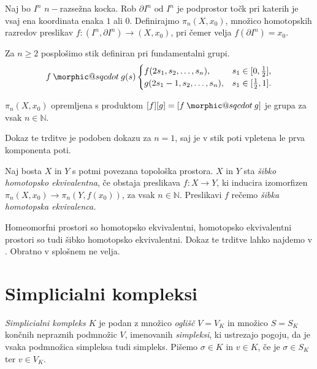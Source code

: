\documentclass[mat1]{fmfdelo}
\makeatletter
\DeclareRobustCommand{\sqcdot}{\mathbin{\mathpalette\morphic@sqcdot\relax}}
\newcommand{\morphic@sqcdot}[2]{%
\sbox\z@{$\m@th#1\centerdot$}%
\ht\z@=.33333\ht\z@
\vcenter{\box\z@}%
}
\newcommand{\N}{\mathbb N}
\makeatother
\begin{document}
Naj bo $I^n$ $n-$razsežna kocka. Rob $\partial I^n \text{ od } I^n$ je podprostor točk pri katerih je vsaj ena koordinata enaka $1$ ali $0$. Definirajmo $\pi_n(X,x_0)$, množico homotopskih razredov preslikav $f\colon (I^n,\partial I^n) \rightarrow (X,x_0)$, pri čemer velja $f(\partial I^n) = x_0$.

Za $n\ge 2$ posplošimo stik definiran pri fundamentalni grupi.
$$ f\sqcdot g(s) \begin{cases}
f(2s_1,s_2,\ldots,s_n), & s_1\in [0,\frac{1}{2}], \\
g(2s_1-1,s_2,\ldots,s_n), & s_1 \in [\frac{1}{2},1].
\end{cases}
$$


\begin{izrek}
    $\pi_n(X,x_0)$ opremljena s produktom $[f][g] = [f\sqcdot g]$ je grupa za vsak $n \in \N$.
\end{izrek}

Dokaz te trditve je podoben dokazu za $n=1$, saj je v stik poti vpletena le prva komponenta poti.

\begin{definicija}
    Naj bosta $X$ in $Y$ s potmi povezana topološka prostora.  $X$ in $Y$ sta \emph{šibko homotopsko ekvivalentna}, če obstaja preslikava $f\colon X\rightarrow Y$, ki inducira izomorfizen $\pi_n(X,x_0)\rightarrow \pi_n(Y,f(x_0))$, za vsak $n \in \N$. Preslikavi $f$ rečemo \emph{šibka homotopska ekvivalenca.}
\end{definicija}



Homeomorfni prostori so homotopsko ekvivalentni, homotopsko ekvivalentni prostori so tudi šibko homotopsko ekvivalentni. Dokaz te trditve lahko najdemo v \cite[razdelka 1.1 in 4.1]{hatcher}. Obratno v splošnem ne velja.


\section{Simplicialni kompleksi}\label{sec:simpleks}


\begin{definicija}
    \emph{Simplicialni kompleks $K$} je podan z množico \emph{oglišč} $V=V_K$ in množico $S=S_K$ končnih nepraznih podmnožic $V$, imenovanih \emph{simpleksi}, ki ustrezajo pogoju, da je vsaka podmnožica simpleksa tudi simpleks. Pišemo $\sigma \in K$ in $v \in K$, če je $\sigma \in S_K$ ter $v \in V_K$. 
\end{definicija}
\end{document}
